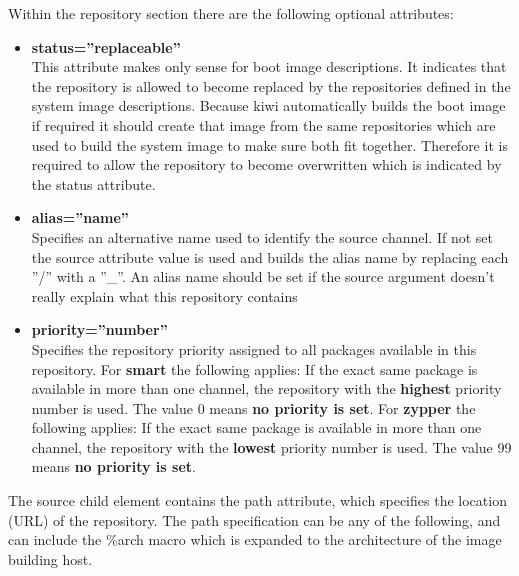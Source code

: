 Within the repository section there are the following optional
attributes:

\begin{itemize}
\item \textbf{status=''replaceable''}\\
      This attribute makes only sense for boot image descriptions.
      It indicates that the repository is allowed to become replaced by
      the repositories defined in the system image descriptions. Because kiwi
      automatically builds the boot image if required it should create that
      image from the same repositories which are used to build the system
      image to make sure both fit together. Therefore it is required to allow
      the repository to become overwritten which is indicated by the status
      attribute.
\item \textbf{alias=''name''}\\
      Specifies an alternative name used to identify the source channel.
      If not set the source attribute value is used and builds the alias name
      by replacing each ''/'' with a ''\_''. An alias name should be set if
      the source argument doesn't really explain what this repository
      contains 
\item \textbf{priority=''number''}\\
      Specifies the repository priority assigned to all packages available in
      this repository. For \textbf{smart} the following applies: If the
      exact same package is available in more than one channel, the repository
      with the \textbf{highest} priority number is used. The value 0 means
      \textbf{no priority is set}. For \textbf{zypper} the following applies:
      If the exact same package is available in more than one channel, the
      repository with the \textbf{lowest} priority number is used. The value
      99 means \textbf{no priority is set}.
\end{itemize}

The source child element contains the path attribute, which specifies
the location (URL) of the repository. The path specification can be any
of the following, and can include the \%arch macro which is expanded
to the architecture of the image building host.

